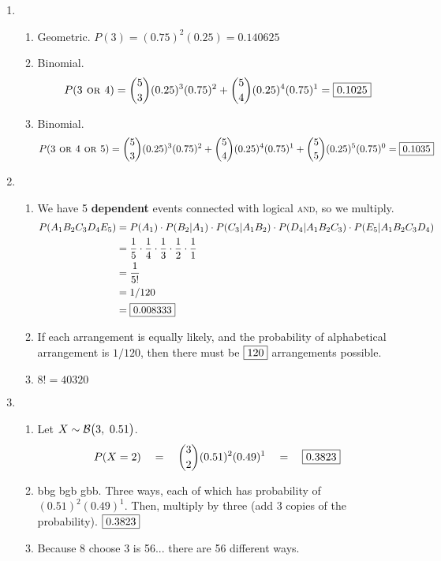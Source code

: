 \documentclass[12pt,letterpaper]{article}
\begin{document}
\begin{enumerate}
\newpage

\item \begin{enumerate} 
\item Geometric. $P(3) = (0.75)^2(0.25) = 0.140625$
\item Binomial. $$P(3 \textsc{~or~} 4) = {5\choose 3}(0.25)^3(0.75)^2 + {5\choose 4}(0.25)^4(0.75)^1 = \fbox{0.1025} $$
\item Binomial. $$P(3 \textsc{~or~} 4 \textsc{~or~} 5) = {5\choose 3}(0.25)^3(0.75)^2 + {5\choose 4}(0.25)^4(0.75)^1+ {5\choose 5}(0.25)^5(0.75)^0 = \fbox{0.1035} $$
\end{enumerate}

\item \begin{enumerate} 
\item We have 5 {\bf dependent} events connected with logical \textsc{and}, so we multiply.
\begin{align*} 
P(A_1B_2C_3D_4E_5) &= P(A_1)\cdot P(B_2|A_1) \cdot P(C_3|A_1B_2)\cdot P(D_4|A_1B_2C_3) \cdot P(E_5|A_1B_2C_3D_4)\\
&= \frac{1}{5} \cdot \frac{1}{4} \cdot \frac{1}{3} \cdot \frac{1}{2} \cdot \frac{1}{1} \\
&= \frac{1}{5!} \\
&= 1/120 \\
&= \fbox{0.008333}
\end{align*}
\item If each arrangement is equally likely, and the probability of alphabetical arrangement is $1/120$, then there must be $\fbox{120}$ arrangements possible.
\item $8! = 40320$
\end{enumerate}


\item \begin{enumerate} 
\item Let $X\sim \mathcal{B}\big(3,~0.51\big)$. 
$$P(X=2) ~~~=~~~ {3\choose 2}(0.51)^2(0.49)^1 ~~~=~~~ \fbox{0.3823} $$
\item bbg bgb gbb. Three ways, each of which has probability of $(0.51)^2(0.49)^1$. Then, multiply by three (add 3 copies of the probability). $\fbox{0.3823}$
\item Because 8 choose 3 is 56... there are 56 different ways.

\end{enumerate}


\end{enumerate}
\end{document}
